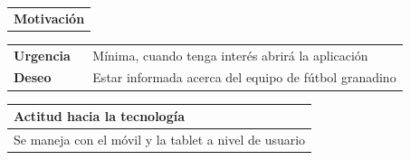 \documentclass[11pt]{article}
\begin{document}
\begin{table}[H]
  \begin{tabular}{l}
    \textbf{Motivación} 
  \end{tabular}

  \begin{tabular}{p{0.2\linewidth}|p{0.8\linewidth}}
    \toprule
    \textbf{Urgencia} & Mínima, cuando tenga interés abrirá la aplicación\\
    \textbf{Deseo}  & Estar informada acerca del equipo de fútbol granadino \\
    \bottomrule
  \end{tabular}

  \begin{tabular}{p{1.028\linewidth}}
    \textbf{Actitud hacia la tecnología}\\
    \midrule
    Se maneja con el móvil y la tablet a nivel de usuario
  \end{tabular}
\end{table}
\end{document}
